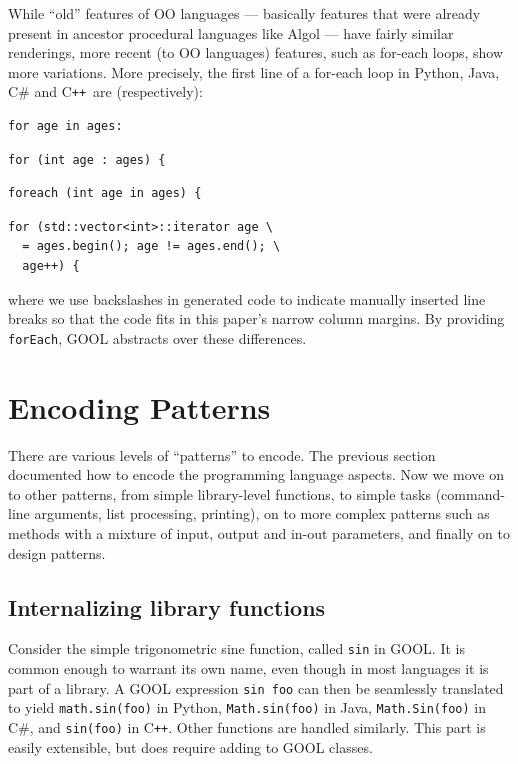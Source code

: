 \documentclass[sigplan,review,anonymous,prologue,dvipsnames]{acmart}
\newcommand{\Csharp}{C\#}
\newcommand{\Cplusplus}{C\texttt{++}}
\begin{document}
While ``old'' features of OO languages --- basically features that
were already present in ancestor procedural languages like Algol ---
have fairly similar renderings, more recent (to OO languages) features,
such as for-each loops, show more variations.  More precisely,
the first line of a for-each loop in Python, Java, \Csharp{} and
\Cplusplus~are (respectively):
\begin{lstlisting}
for age in ages:
\end{lstlisting}
\begin{lstlisting}
for (int age : ages) {
\end{lstlisting}
\begin{lstlisting}
foreach (int age in ages) {
\end{lstlisting}
\begin{lstlisting}
for (std::vector<int>::iterator age \
  = ages.begin(); age != ages.end(); \
  age++) {
\end{lstlisting}
where we use backslashes in generated code to indicate manually inserted
line breaks so that the code fits in this paper's narrow column margins. By 
providing \verb|forEach|, GOOL abstracts over these differences.

\section{Encoding Patterns} \label{sec:patterns}

There are various levels of ``patterns'' to encode. The previous section
documented how to encode the programming language aspects. Now we
move on to other patterns, from simple library-level functions, to
simple tasks (command-line arguments, list processing, printing), on to
more complex patterns such as methods with a mixture of input, output
and in-out parameters, and finally on to design patterns.

\subsection{Internalizing library functions}

Consider the simple trigonometric sine function, called \verb|sin| in
GOOL. It is common enough to warrant its own name, even though in most
languages it is part of a library.  A GOOL expression \verb|sin foo|
can then be seamlessly translated to 
yield \verb|math.sin(foo)| in Python, \verb|Math.sin(foo)| in Java,
\verb|Math.Sin(foo)| in \Csharp, and \verb|sin(foo)| in \Cplusplus. Other
functions are handled similarly.  This part is easily extensible, but does
require adding to GOOL classes.
\end{document}
